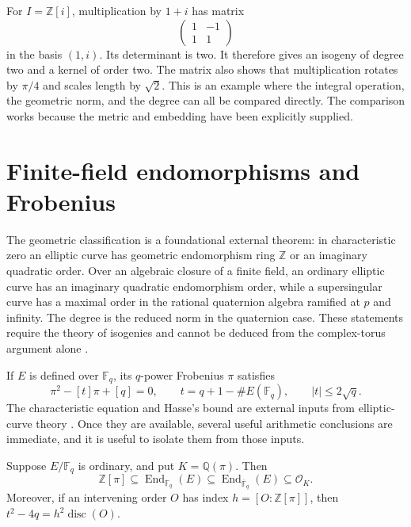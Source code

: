 \begin{example}
For $I=\mathbb Z[i]$, multiplication by $1+i$ has matrix
\[
 \begin{pmatrix}1&-1\\1&1\end{pmatrix}
\]
in the basis $(1,i)$. Its determinant is two. It therefore gives
an isogeny of degree two and a kernel of order two. The matrix
also shows that multiplication rotates by $\pi/4$ and scales
length by $\sqrt2$. This is an example where the integral
operation, the geometric norm, and the degree can all be compared
directly. The comparison works because the metric and embedding
have been explicitly supplied.
\end{example}

\section{Finite-field endomorphisms and Frobenius}

The geometric classification is a foundational external theorem:
in characteristic zero an elliptic curve has geometric endomorphism
ring $\mathbb Z$ or an imaginary quadratic order. Over an algebraic
closure of a finite field, an ordinary elliptic curve has an
imaginary quadratic endomorphism order, while a supersingular curve
has a maximal order in the rational quaternion algebra ramified at
$p$ and infinity. The degree is the reduced norm in the quaternion
case. These statements require the theory of isogenies and cannot
be deduced from the complex-torus argument alone
\cite[Theorem~42.1.9]{Voight2021Supersingular}.

If $E$ is defined over $\mathbb F_q$, its $q$-power Frobenius
$\pi$ satisfies
\[
 \pi^2-[t]\pi+[q]=0,
 \qquad t=q+1-\#E(\mathbb F_q),
 \qquad |t|\le2\sqrt q.
\]
The characteristic equation and Hasse's bound are external inputs
from elliptic-curve theory \cite{Sutherland2023Hasse,Sutherland2023EndAlgebras}.
Once they are available, several useful arithmetic conclusions
are immediate, and it is useful to isolate them from those inputs.

\begin{proposition}
Suppose $E/\mathbb F_q$ is ordinary, and put
$K=\mathbb Q(\pi)$. Then
\[
 \mathbb Z[\pi]\subseteq\operatorname{End}_{\mathbb F_q}(E)
 \subseteq\operatorname{End}_{\overline{\mathbb F}_q}(E)
 \subseteq\mathcal O_K.
\]
Moreover, if an intervening order $O$ has index
$h=[O:\mathbb Z[\pi]]$, then
$t^2-4q=h^2\operatorname{disc}(O)$.
\end{proposition}

